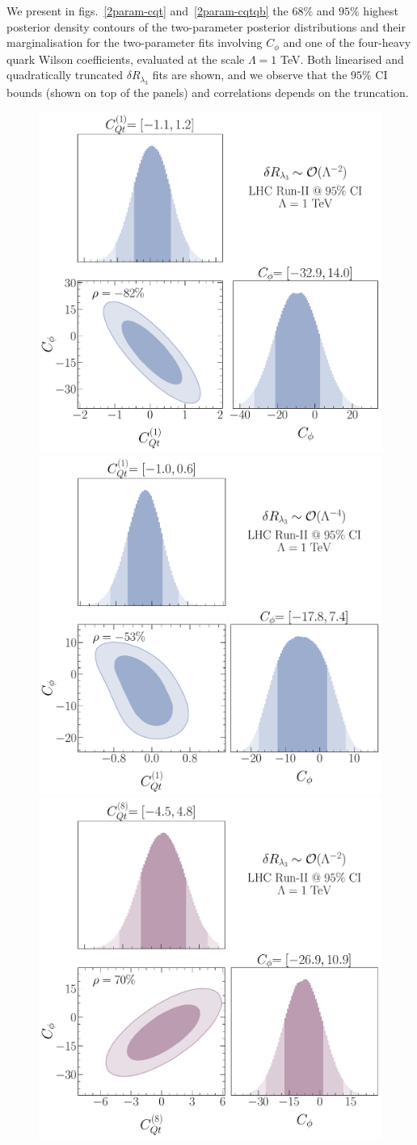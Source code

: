 We present in figs.~\ref{2param-cqt} and~\ref{2param-cqtqb} the $68\%$ and $ 95\%$  highest posterior density contours of the two-parameter posterior distributions and their marginalisation for the two-parameter fits involving $C_\phi$ and one of the four-heavy quark Wilson coefficients, evaluated at the scale $\Lambda=1$ TeV.  
Both linearised and quadratically truncated $\delta R_{\lambda_3}$ fits are shown, and we observe that the $95\%$ CI bounds (shown on top of the panels) and correlations depends on the truncation.
\begin{figure}[h!]
	\begin{center}
		\includegraphics[width=0.45\linewidth]{fig/Cqt1_LHC_RunII_linearl3_rge}
		\includegraphics[width=0.45\linewidth]{fig/Cqt1_LHC_RunII_quadl3_rge} \\ 
		\includegraphics[width=0.45\linewidth]{fig/Cqt8_LHC_RunII_linearl3_rge}

\end{center}
\end{figure}
